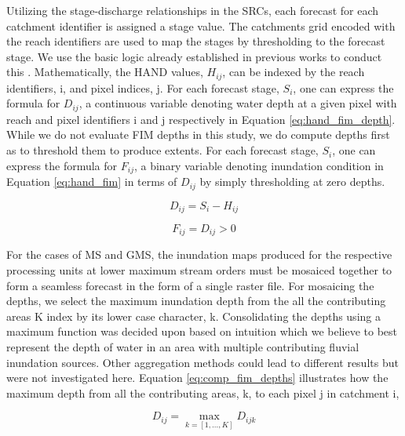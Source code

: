 Utilizing the stage-discharge relationships in the SRCs, each forecast for each catchment identifier is assigned a stage value. 
The catchments grid encoded with the reach identifiers are used to map the stages by thresholding to the forecast stage.
We use the basic logic already established in previous works to conduct this \cite{nobre2016hand,liu2016cybergis,maidment2017conceptual}.
Mathematically, the HAND values, $H_{ij}$, can be indexed by the reach identifiers, i, and pixel indices, j.
For each forecast stage, $S_i$, one can express the formula for $D_{ij}$, a continuous variable denoting water depth at a given pixel with reach and pixel identifiers i and j respectively in Equation \ref{eq:hand_fim_depth}.
While we do not evaluate FIM depths in this study, we do compute depths first as to threshold them to produce extents.
For each forecast stage, $S_i$, one can express the formula for $F_{ij}$, a binary variable denoting inundation condition in Equation \ref{eq:hand_fim} in terms of $D_{ij}$ by simply thresholding at zero depths.
%
\begin{linenomath*}
\begin{equation}
\label{eq:hand_fim_depth}
    D_{ij} = S_i - H_{ij}
\end{equation}
\end{linenomath*}
%
\begin{linenomath*}
\begin{equation}
\label{eq:hand_fim}
    F_{ij} = D_{ij} > 0
\end{equation}
\end{linenomath*}
%
For the cases of MS and GMS, the inundation maps produced for the respective processing units at lower maximum stream orders must be mosaiced together to form a seamless forecast in the form of a single raster file.
For mosaicing the depths, we select the maximum inundation depth from the all the contributing areas K index by its lower case character, k.
Consolidating the depths using a maximum function was decided upon based on intuition which we believe to best represent the depth of water in an area with multiple contributing fluvial inundation sources.
Other aggregation methods could lead to different results but were not investigated here.
Equation \ref{eq:comp_fim_depths} illustrates how the maximum depth from all the contributing areas, k, to each pixel j in catchment i,
%
\begin{linenomath*}
\begin{equation}
\label{eq:comp_fim_depths}
    D_{ij} = \max_{k=[1,...,K]} D_{ijk}
\end{equation}
\end{linenomath*}
